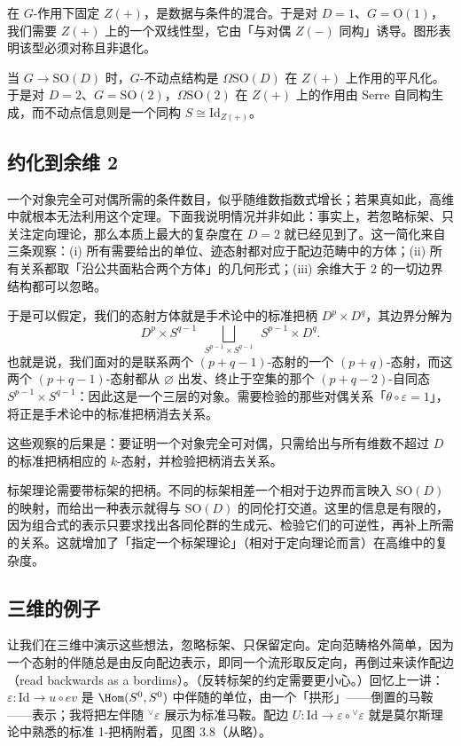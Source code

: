 \begin{remark}[不动点结构]
在 $G$-作用下固定 $Z(+)$，是数据与条件的混合。于是对 $D=1$、$G=\mathrm{O}(1)$，我们需要 $Z(+)$ 上的一个双线性型，它由「与对偶 $Z(-)$ 同构」诱导。图形表明该型必须对称且非退化。

当 $G\to\mathrm{SO}(D)$ 时，$G$-不动点结构是 $\Omega\mathrm{SO}(D)$ 在 $Z(+)$ 上作用的平凡化。于是对 $D=2$、$G=\mathrm{SO}(2)$，$\Omega\mathrm{SO}(2)$ 在 $Z(+)$ 上的作用由 Serre 自同构生成，而不动点信息则是一个同构 $S\cong\mathrm{Id}_{Z(+)}$。
\end{remark}

\subsection{约化到余维 2}

一个对象完全可对偶所需的条件数目，似乎随维数指数式增长；若果真如此，高维中就根本无法利用这个定理。下面我说明情况并非如此：事实上，若忽略标架、只关注定向理论，那么本质上最大的复杂度在 $D=2$ 就已经见到了。这一简化来自三条观察：(i) 所有需要给出的单位、迹态射都对应于配边范畴中的方体；(ii) 所有关系都取「沿公共面粘合两个方体」的几何形式；(iii) 余维大于 $2$ 的一切边界结构都可以忽略。

于是可以假定，我们的态射方体就是手术论中的标准把柄 $D^p\times D^q$，其边界分解为
\[
D^p\times S^{q-1}\ \ \bigsqcup_{S^{p-1}\times S^{q-1}}\ \ S^{p-1}\times D^q .
\]
也就是说，我们面对的是联系两个 $(p+q-1)$-态射的一个 $(p+q)$-态射，而这两个 $(p+q-1)$-态射都从 $\varnothing$ 出发、终止于空集的那个 $(p+q-2)$-自同态 $S^{p-1}\times S^{q-1}$：因此这是一个三层的对象。需要检验的那些对偶关系「$\theta\circ\varepsilon=1$」，将正是手术论中的标准把柄消去关系。

这些观察的后果是：要证明一个对象完全可对偶，只需给出与所有维数不超过 $D$ 的标准把柄相应的 $k$-态射，并检验把柄消去关系。

标架理论需要带标架的把柄。不同的标架相差一个相对于边界而言映入 $\mathrm{SO}(D)$ 的映射，而给出一种表示就得与 $\mathrm{SO}(D)$ 的同伦打交道。这里的信息是有限的，因为组合式的表示只要求找出各同伦群的生成元、检验它们的可逆性，再补上所需的关系。这就增加了「指定一个标架理论」（相对于定向理论而言）在高维中的复杂度。

\subsection{三维的例子}

让我们在三维中演示这些想法，忽略标架、只保留定向。定向范畴格外简单，因为一个态射的伴随总是由反向配边表示，即同一个流形取反定向，再倒过来读作配边（read backwards as a bordims）。（反转标架的约定需要更小心。）回忆上一讲：$\varepsilon\colon\mathrm{Id}\to u\circ ev$ 是 $\Hom(S^0,S^0)$ 中伴随的单位，由一个「拱形」——倒置的马鞍——表示；我将把左伴随 ${}^\vee\varepsilon$ 展示为标准马鞍。配边 $U\colon\mathrm{Id}\to\varepsilon\circ{}^\vee\varepsilon$ 就是莫尔斯理论中熟悉的标准 1-把柄附着，见图 3.8（从略）。

